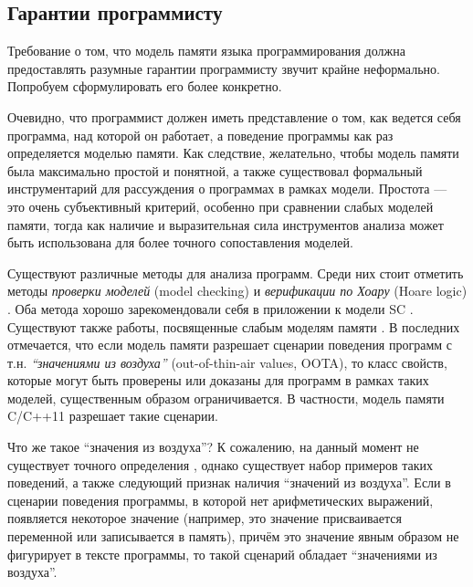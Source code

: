 \subsection{Гарантии программисту} %
Требование о том, что модель памяти языка программирования должна предоставлять разумные
гарантии программисту звучит крайне неформально.
Попробуем сформулировать его более конкретно.

Очевидно, что программист должен иметь представление о том, как ведется себя программа, над
которой он работает, а поведение программы как раз определяется моделью памяти.
Как следствие, желательно, чтобы модель памяти была максимально простой и понятной,
а также существовал формальный инструментарий для рассуждения о программах в рамках модели.
Простота --- это очень субъективный критерий, особенно при сравнении слабых моделей памяти,
тогда как наличие и выразительная сила инструментов анализа может быть
использована для более точного сопоставления моделей.

Существуют различные методы для анализа программ.
Среди них стоит отметить методы \emph{проверки моделей} (model checking) \cite{Peled-al:BOOK08,Clarke-al:BOOK99} и
\emph{верификации по Хоару} (Hoare logic) \cite{Hoare:CACM69}.
Оба метода хорошо зарекомендовали себя в приложении к модели SC
\cite{Owicki-Gries:AI76,Owicki-Gries:CACM76,OHearn:CONCUR04,Bornat-al:POPL05,Hobor-al:ESOP08,Dockins-al:ENTCS08,
Hobor-Gherghina:ESOP11,Gotsman-al:APLAS07,Jacobs-Piessens:POPL11,Svendsen-Birkedal:ESOP14,DinsdaleYoung-al:ECOOP10,Jung-al:POPL15,
LeyWild-Nanevski:POPL13,Sergey-al:PLDI15,Vechev-al:STTT13,Raychev-al:SAS13}.
Существуют также работы, посвященные слабым моделям памяти
\cite{Kaiser-al:ECOOP17,Vafeiadis-Narayan:OOPSLA13,Turon-al:OOPSLA14,Lahav-Vafeiadis:ICALP15,Meshman-al:FMCAD15,Dan-al:SAS13}.
В последних отмечается, что если модель памяти разрешает сценарии поведения программ с т.н.
\emph{``значениями из воздуха''} (out-of-thin-air values, OOTA),
то класс свойств, которые могут быть проверены или доказаны для программ в
рамках таких моделей, существенным образом ограничивается.
В частности, модель памяти C/C++11 разрешает такие сценарии.

Что же такое ``значения из воздуха''? К сожалению, на данный момент не существует точного определения \cite{Boehm-Demsky:MSPC14},
однако существует набор примеров таких поведений, а также следующий признак наличия ``значений из воздуха''.
Если в сценарии поведения программы, в которой нет арифметических выражений,
появляется некоторое значение (например, это значение присваивается переменной или записывается в память), причём это
значение явным образом не фигурирует в тексте программы, то такой сценарий обладает ``значениями из воздуха''.

